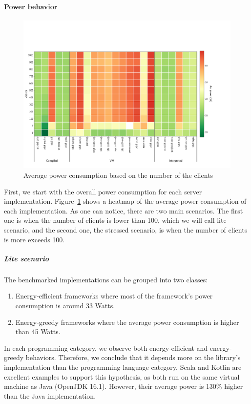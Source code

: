 \paragraph{Power behavior}
\begin{figure}[!htb]
    \begin{center}
        \includegraphics[width=1.2\linewidth]{imgs/power_consumption_clients}
    \end{center}
    \caption{Average power consumption based on the number of the clients}\label{fig:power_consumption_clients}
\end{figure}
First, we start with the overall power consumption for each server implementation.
Figure~\ref{fig:power_consumption_clients} shows a heatmap of the average power consumption of each implementation. As one can notice, there are two main scenarios. The first one is when the number of clients is lower than 100, which we will call \textsf{lite scenario}, and the second one, the \textsf{stressed scenario}, is when the number of clients is more exceeds 100.

\subparagraph{Lite scenario}
The benchmarked implementations can be grouped into two classes:
\begin{enumerate}
    \item \textsf{Energy-efficient frameworks} where most of the framework's power consumption is around 33 Watts.
    \item \textsf{Energy-greedy frameworks} where the average power consumption is higher than 45 Watts.
\end{enumerate}
In each programming category, we observe both energy-efficient and energy-greedy behaviors.
Therefore, we conclude that it depends more on the library's implementation than the programming language category.
Scala and Kotlin are excellent examples to support this hypothesis, as both run on the same virtual machine as Java (OpenJDK 16.1).
However, their average power is 130\% higher than the Java implementation.

